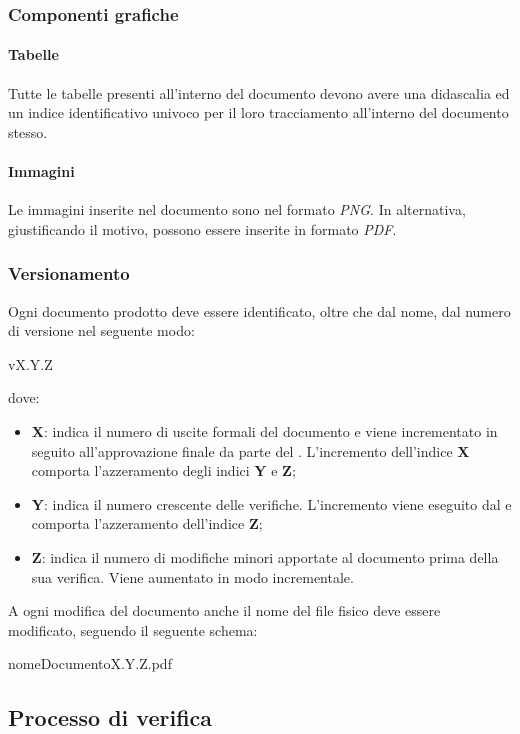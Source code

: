 \subsubsection{Componenti grafiche}
\paragraph{Tabelle}
Tutte le tabelle presenti all'interno del documento devono avere una didascalia 
ed un indice identificativo univoco per il loro tracciamento all'interno del 
documento stesso.
\paragraph{Immagini}
Le immagini inserite nel documento sono nel formato \textit{PNG}. In alternativa, 
giustificando il motivo, possono essere inserite in formato \textit{PDF}.
\subsubsection{Versionamento}
Ogni documento prodotto deve essere identificato, oltre che dal nome, dal numero 
di versione nel seguente modo:
\begin{center}
  vX.Y.Z
\end{center}
dove:

\begin{itemize}
  \item \textbf{X}: indica il numero di uscite formali del documento e viene 
  incrementato in seguito all'approvazione finale da parte del \textit{\RdP}. 
  L'incremento dell'indice \textbf{X} comporta l'azzeramento degli indici 
  \textbf{Y} e \textbf{Z};
  \item \textbf{Y}: indica il numero crescente delle verifiche. L'incremento viene 	eseguito dal \textit{\Ver} e comporta l'azzeramento dell'indice \textbf{Z};
  \item \textbf{Z}: indica il numero di modifiche minori apportate al documento 
  prima della sua verifica. Viene aumentato in modo incrementale. 
  \end{itemize}
A ogni modifica del documento anche il nome del file fisico deve essere 
modificato, seguendo il seguente schema:
\begin{center}
  nomeDocumentoX.Y.Z.pdf
\end{center}

\subsection{Processo di verifica}
